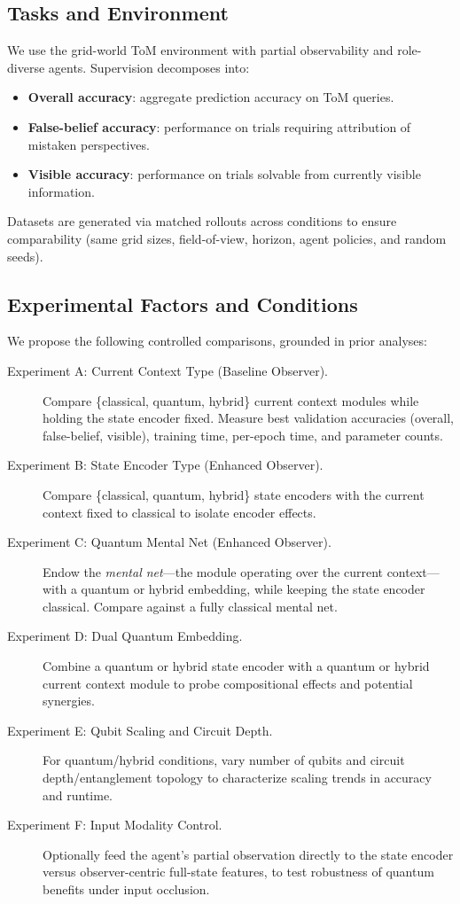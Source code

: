 \subsection{Tasks and Environment}
We use the grid-world ToM environment with partial observability and role-diverse agents. Supervision decomposes into:
\begin{itemize}
  \item \textbf{Overall accuracy}: aggregate prediction accuracy on ToM queries.
  \item \textbf{False-belief accuracy}: performance on trials requiring attribution of mistaken perspectives.
  \item \textbf{Visible accuracy}: performance on trials solvable from currently visible information.
\end{itemize}
Datasets are generated via matched rollouts across conditions to ensure comparability (same grid sizes, field-of-view, horizon, agent policies, and random seeds).

\subsection{Experimental Factors and Conditions}
We propose the following controlled comparisons, grounded in prior analyses:
\begin{description}
  \item[Experiment A: Current Context Type (Baseline Observer).] Compare \{classical, quantum, hybrid\} current context modules while holding the state encoder fixed. Measure best validation accuracies (overall, false-belief, visible), training time, per-epoch time, and parameter counts.
  \item[Experiment B: State Encoder Type (Enhanced Observer).] Compare \{classical, quantum, hybrid\} state encoders with the current context fixed to classical to isolate encoder effects.
  \item[Experiment C: Quantum Mental Net (Enhanced Observer).] Endow the \emph{mental net}---the module operating over the current context---with a quantum or hybrid embedding, while keeping the state encoder classical. Compare against a fully classical mental net.
  \item[Experiment D: Dual Quantum Embedding.] Combine a quantum or hybrid state encoder with a quantum or hybrid current context module to probe compositional effects and potential synergies.
  \item[Experiment E: Qubit Scaling and Circuit Depth.] For quantum/hybrid conditions, vary number of qubits and circuit depth/entanglement topology to characterize scaling trends in accuracy and runtime.
  \item[Experiment F: Input Modality Control.] Optionally feed the agent’s partial observation directly to the state encoder versus observer-centric full-state features, to test robustness of quantum benefits under input occlusion.
\end{description}

